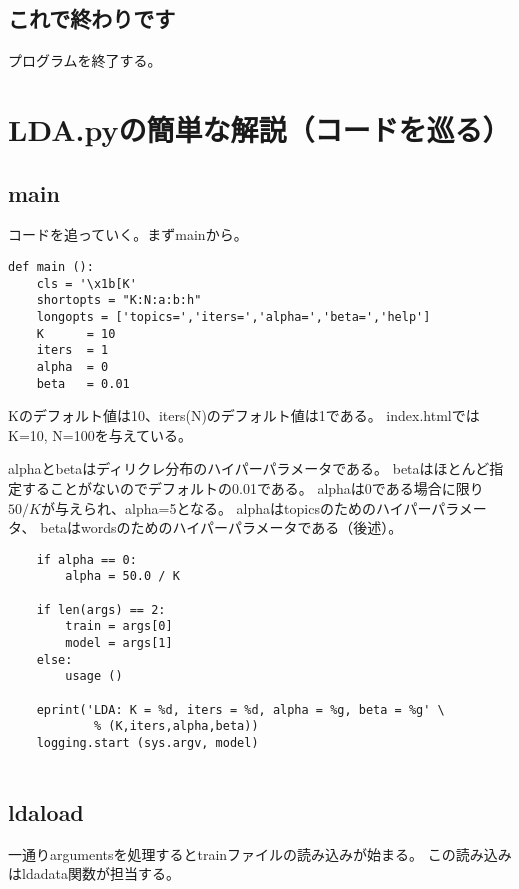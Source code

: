 \documentclass[uplatex]{jsarticle}
\begin{document}
\subsection{これで終わりです}
プログラムを終了する。



\section{LDA.pyの簡単な解説（コードを巡る）}


\subsection{main}
コードを追っていく。まずmainから。

\begin{lstlisting}
def main ():
    cls = '\x1b[K'
    shortopts = "K:N:a:b:h"
    longopts = ['topics=','iters=','alpha=','beta=','help']
    K      = 10
    iters  = 1
    alpha  = 0
    beta   = 0.01
\end{lstlisting}

Kのデフォルト値は10、iters(N)のデフォルト値は1である。
index.htmlではK=10, N=100を与えている。

alphaとbetaはディリクレ分布のハイパーパラメータである。
betaはほとんど指定することがないのでデフォルトの0.01である。
alphaは0である場合に限り$50/K$が与えられ、alpha=5となる。
alphaはtopicsのためのハイパーパラメータ、
betaはwordsのためのハイパーパラメータである（後述）。
\begin{lstlisting}
    if alpha == 0:
        alpha = 50.0 / K

    if len(args) == 2:
        train = args[0]
        model = args[1]
    else:
        usage ()

    eprint('LDA: K = %d, iters = %d, alpha = %g, beta = %g' \
            % (K,iters,alpha,beta))
    logging.start (sys.argv, model)
          
\end{lstlisting}

\subsection{ldaload}
一通りargumentsを処理するとtrainファイルの読み込みが始まる。
この読み込みはldadata関数が担当する。
\end{document}
